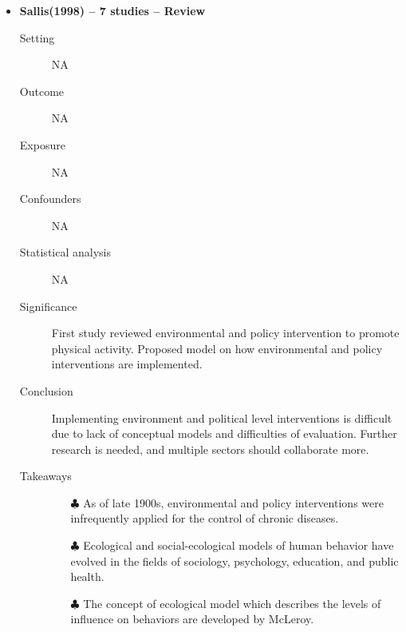 \documentclass{article}
\begin{document}
\begin{itemize}
\item{\bf Sallis(1998) -- 7 studies  -- Review} 
		\begin{description}
			\item[Setting] NA 
			\item[Outcome] NA 
			\item[Exposure] NA 
			\item[Confounders] NA 
			\item[Statistical analysis] NA 
			\item[Significance] First study reviewed environmental and policy intervention to promote physical activity. Proposed model on how environmental and policy interventions are implemented.  
			\item[Conclusion] Implementing environment and political level interventions is difficult due to lack of conceptual models and difficulties of evaluation. Further research is needed, and multiple sectors should collaborate more. 
			\item[Takeaways] \mbox{}\par
				\begin{itemize}
					\item[$\clubsuit$] As of late 1900s, environmental and policy interventions were infrequently applied for the control of chronic diseases. 
					\item[$\clubsuit$] Ecological and social-ecological models of human behavior have evolved in the fields of sociology, psychology, education, and public health. 
					\item[$\clubsuit$] The concept of ecological model which describes the levels of influence on behaviors are developed by McLeroy. 
				\end{itemize} 
		\end{description}


\end{itemize}
\end{document}
